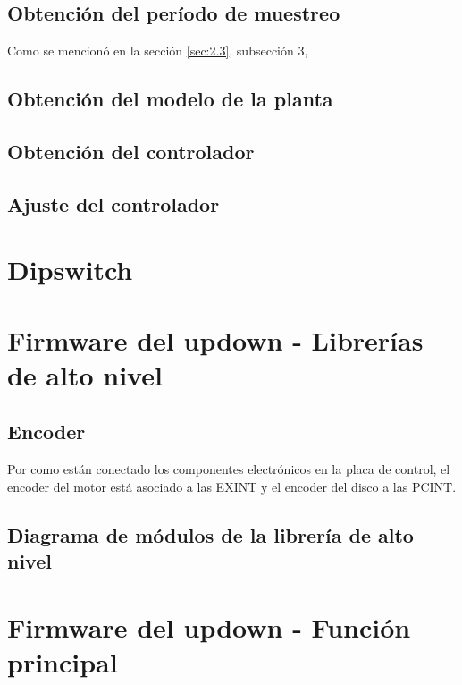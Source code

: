 \subsection{Obtención del período de muestreo}
Como se mencionó en la sección \ref{sec:2.3}, subsección 3, 

\subsection{Obtención del modelo de la planta}

\subsection{Obtención del controlador}

\subsection{Ajuste del controlador}


\section{Dipswitch} \label{sec:\thesection}

\section{Firmware del updown - Librerías de alto nivel} \label{sec:\thesection}

\subsection{Encoder}

Por como están conectado los componentes electrónicos en la placa de control, el encoder del motor está asociado a las EXINT y el encoder del disco a las PCINT.

\subsection{Diagrama de módulos de la librería de alto nivel}

\section{Firmware del updown - Función principal} \label{sec:\thesection}


